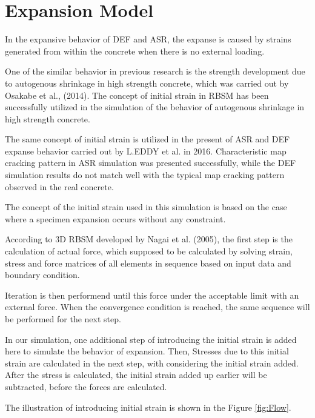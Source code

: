 \section{Expansion Model}

In the expansive behavior of DEF and ASR, the expanse is caused by strains generated from within the concrete when there is no external loading.

One of the similar behavior in previous research is the strength development due to autogenous shrinkage in high strength concrete, which was carried out by Osakabe et al., (2014)\cite{Osakabe}. The concept of initial strain in RBSM has been successfully utilized in the simulation of the behavior of autogenous shrinkage in high strength concrete.

The same concept of initial strain is utilized in the present of ASR and DEF expanse behavior carried out by L.EDDY et al. in 2016\cite{Eddy}. Characteristic map cracking pattern in ASR simulation was presented successfully, while the DEF simulation results do not match well with the typical map cracking pattern observed in the real concrete.

The concept of the initial strain used in this simulation is based on the case where a specimen expansion occurs without any constraint.

According to 3D RBSM developed by Nagai et al. (2005)\cite{Nagai}, the first step is the calculation of actual force, which supposed to be calculated by solving strain, stress and force matrices of all elements in sequence based on input data and boundary condition.

Iteration is then performend until this force under the acceptable limit with an external force. When the convergence condition is reached, the same sequence will be performed for the next step.

In our simulation, one additional step of introducing the initial strain is added here to simulate the behavior of expansion. Then, Stresses due to this initial strain are calculated in the next step, with considering the initial strain added. After the stress is calculated, the initial strain added up earlier will be subtracted, before the forces are calculated.

The illustration of introducing initial strain is shown in the Figure \ref{fig:Flow}.

